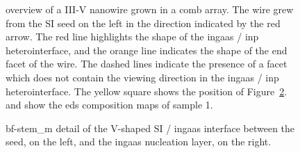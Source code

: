\begin{figure}
{    }
    \caption[Overview, composition analysis, and detail of the seed/\acs{ingaas} interface in sample 1.]{ overview of a III-V nanowire grown in a comb array. The wire grew from the \acs{SI} seed on the left in the direction indicated by the red arrow. The red line highlights the shape of the \acs{ingaas} / \acs{inp} heterointerface, and the orange line indicates the shape of the end facet of the wire. The dashed lines indicate the presence of a facet which does not contain the viewing direction in the \acs{ingaas} / \acs{inp} heterointerface. The yellow square shows the position of Figure~\ref{subfig:si-ingaas_s1}.  and  show the \acs{eds} composition maps of sample 1.}
    \label{fig:sample1}
\end{figure}

\begin{figure}
    \centering
    \caption[\acs{bf}-\acs{stem_m} detail of the V-shaped \acs{SI} / \acs{ingaas} interface.]{\acs{bf}-\acs{stem_m} detail of the V-shaped \acs{SI} / \acs{ingaas} interface between the seed, on the left, and the \acs{ingaas} nucleation layer, on the right.}
    \label{subfig:si-ingaas_s1}
\end{figure}

